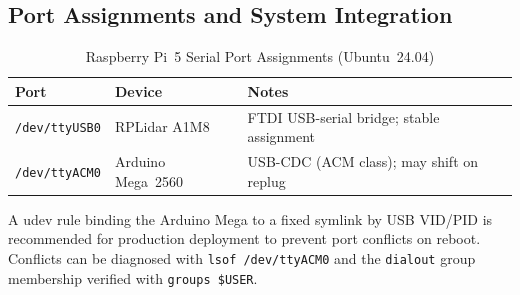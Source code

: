 \documentclass[12pt,a4paper]{report}
\begin{document}
\subsection{Port Assignments and System Integration}
\label{sec:port_assignment_impl}

\begin{table}[H]
\centering
\caption{Raspberry Pi~5 Serial Port Assignments (Ubuntu~24.04)}
\label{tab:port_assignment_impl}
\begin{tabular}{@{}p{3.2cm} p{3.0cm} p{6.5cm}@{}}
\toprule
\rowcolor{rafblue!20}
\textbf{Port}            & \textbf{Device}      & \textbf{Notes} \\
\midrule
\texttt{/dev/ttyUSB0}    & RPLidar A1M8
  & FTDI USB-serial bridge; stable assignment \\
\texttt{/dev/ttyACM0}    & Arduino Mega~2560
  & USB-CDC (ACM class); may shift on replug \\
\bottomrule
\end{tabular}
\end{table}

A udev rule binding the Arduino Mega to a fixed symlink by USB VID/PID is
recommended for production deployment to prevent port conflicts on reboot.
Conflicts can be diagnosed with \texttt{lsof /dev/ttyACM0} and the
\texttt{dialout} group membership verified with
\texttt{groups \$USER}.



\end{document}
